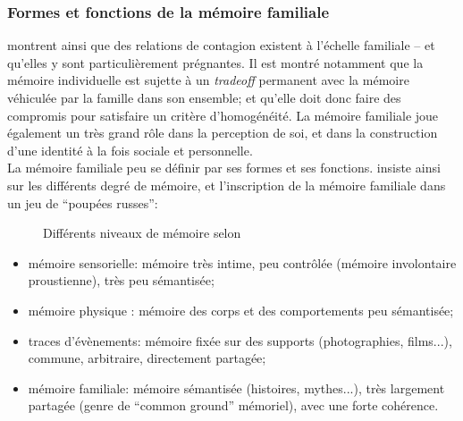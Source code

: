\documentclass[french]{article}
\begin{document}
		\subsubsection{Formes et fonctions de la mémoire familiale}
			\cite{muxel2012,boesen2012,garstenauer2012} montrent ainsi que des relations de contagion existent à l'échelle familiale -- et qu'elles y sont particulièrement prégnantes. Il est montré notamment que la mémoire individuelle est sujette à un \textit{tradeoff} permanent avec la mémoire véhiculée par la famille dans son ensemble; et qu'elle doit donc faire des compromis pour satisfaire un critère d'homogénéité. La mémoire familiale joue également un très grand rôle dans la perception de soi, et dans la construction d'une identité à la fois sociale et personnelle.\\
			La mémoire familiale peu se définir par ses formes et ses fonctions. \cite{muxel2012} insiste ainsi sur les différents degré de mémoire, et l'inscription de la mémoire familiale dans un jeu de ``poupées russes'':
			\begin{figure}[H]
				\centering
				\caption{Différents niveaux de mémoire selon \cite{muxel2012}}
			\end{figure}
			\begin{itemize}
				\item mémoire sensorielle: mémoire très intime, peu contrôlée (mémoire involontaire proustienne), très peu sémantisée;
				\item mémoire physique : mémoire des corps et des comportements peu sémantisée;
				\item traces d'évènements: mémoire fixée sur des supports (photographies, films...), commune, arbitraire, directement partagée;
				\item mémoire familiale: mémoire sémantisée (histoires, mythes...), très largement partagée (genre de ``common ground'' mémoriel), avec une forte cohérence.
			\end{itemize}
\end{document}
